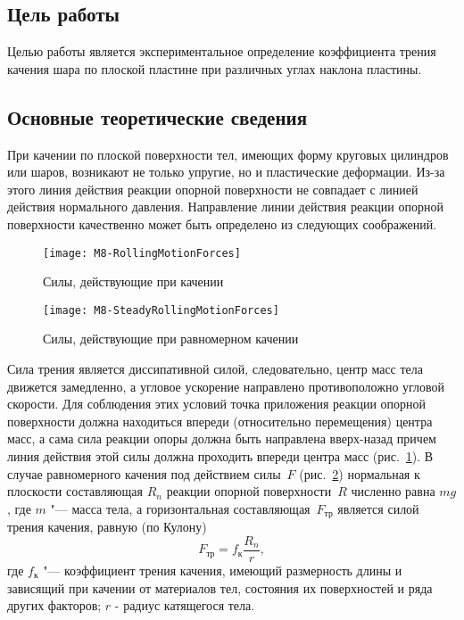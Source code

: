 \documentclass[a4paper, 12pt]{extarticle}
\begin{document}
\MTDTitlePage
\MTDInfoPage

\setcounter{section}{8}

\subsection{Цель работы}
Целью работы является экспериментальное определение коэффициента трения качения шара по плоской пластине при различных углах наклона пластины.

\subsection{Основные теоретические сведения}
При качении по плоской поверхности тел, имеющих форму круговых цилиндров или шаров, возникают не только упругие, но и пластические деформации. Из-за этого линия действия реакции опорной поверхности не совпадает с линией действия нормального давления. Направление линии  действия реакции опорной поверхности качественно может быть определено из следующих соображений.

\begin{figure}[h]
\begin{center}
\texttt{[image: M8-RollingMotionForces]}
\end{center}
\caption{Силы, действующие при качении \label{fig:m8-rolling}}
\end{figure}

\begin{figure}[h]
\begin{center}
\texttt{[image: M8-SteadyRollingMotionForces]}
\end{center}
\caption{Силы, действующие при равномерном качении \label{fig:m8-uniform-rolling}}
\end{figure}

Сила трения является диссипативной силой, следовательно, центр масс тела движется замедленно, а угловое ускорение направлено противоположно угловой скорости. Для соблюдения этих условий точка приложения реакции опорной  поверхности должна находиться впереди (относительно перемещения) центра масс, а сама сила реакции опоры должна быть направлена вверх-назад причем линия действия этой силы должна проходить впереди центра масс (рис.~\ref{fig:m8-rolling}). В случае равномерного качения под действием силы~$F$ (рис.~\ref{fig:m8-uniform-rolling}) нормальная к плоскости составляющая $R_n$ реакции опорной поверхности~$R$ численно равна $mg$, где $m$ "--- масса тела, а горизонтальная составляющая~$F_\text{тр}$ является силой трения качения, равную (по Кулону) %
\begin{equation}
\label{eq:m8-rolling-resistance}
F_\text{тр} = f_\text{к} \frac{R_n}{r}, %
\end{equation}
где $f_\text{к}$ "--- коэффициент трения качения, имеющий размерность длины и зависящий при качении от материалов тел, состояния их поверхностей и ряда других факторов;
$r$ - радиус катящегося тела.
\end{document}
